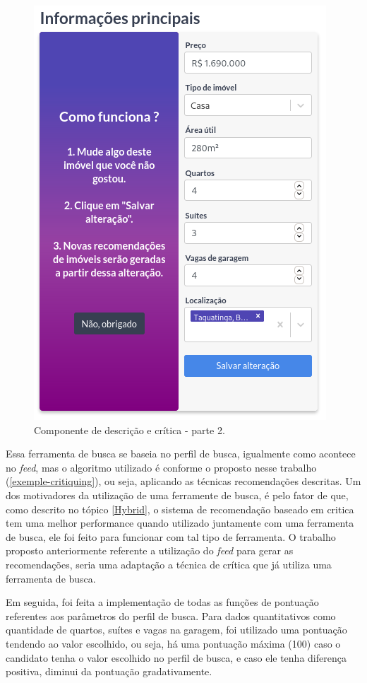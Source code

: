 \begin{figure}[H]
    \centering
    \includegraphics[scale=0.75]{figuras/desenvolvimento/componente_critica2.png}
    \caption[Componente de descrição e crítica - parte 2]{Componente de descrição e crítica - parte 2.}
    \label{fig:componente_critica2}
\end{figure}

Essa ferramenta de busca se baseia no perfil de busca, igualmente como acontece no \textit{feed}, mas o algoritmo utilizado é conforme o proposto nesse trabalho (\ref{exemple-critiquing}), ou seja, aplicando as técnicas recomendações descritas. Um dos motivadores da utilização de uma ferramente de busca, é pelo fator de que, como descrito no tópico \ref{Hybrid}, o sistema de recomendação baseado em critica tem uma melhor performance quando utilizado juntamente com uma ferramenta de busca, ele foi feito para funcionar com tal tipo de ferramenta. O trabalho proposto anteriormente referente a utilização do \textit{feed} para gerar as recomendações, seria uma adaptação a técnica de crítica que já utiliza uma ferramenta de busca.

Em seguida, foi feita a implementação de todas as funções de pontuação referentes aos parâmetros do perfil de busca. Para dados quantitativos como quantidade de quartos, suítes e vagas na garagem, foi utilizado uma pontuação tendendo ao valor escolhido, ou seja, há uma pontuação máxima (100) caso o candidato tenha o valor escolhido no perfil de busca, e caso ele tenha diferença positiva, diminui da pontuação gradativamente.

